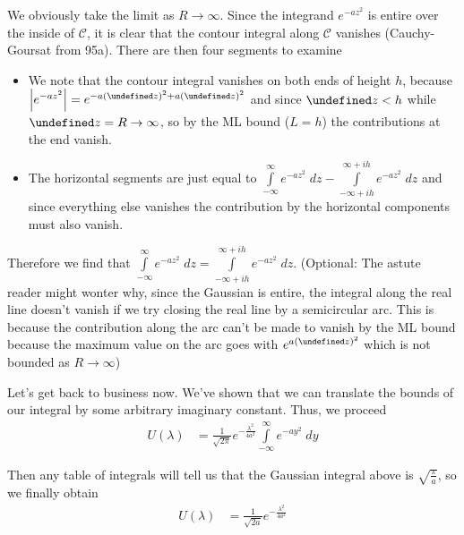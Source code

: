\documentclass[10pt]{article}
\newcommand{\abs}[1]{\left|#1\right|}
\let\Re\undefined
\let\Im\undefined
\DeclareMathOperator{\Re}{Re}
\DeclareMathOperator{\Im}{Im}
\begin{document}
{We obviously take the limit as $R \to \infty$. Since the integrand $e^{-az^2}$ is entire over the inside of $\mathcal{C}$, it is clear that the contour integral along $\mathcal{C}$ vanishes (Cauchy-Goursat from 95a). There are then four segments to examine
\begin{itemize}
    \item We note that the contour integral vanishes on both ends of height $h$, because $\abs{e^{-az^2}} = e^{-a(\Re z)^2 + a(\Im z)^2}$ and since $\Im z < h$ while $\Re z = R \to \infty$, so by the ML bound ($L = h$) the contributions at the end vanish.
    \item The horizontal segments are just equal to $\int\limits_{-\infty}^{\infty}e^{-az^2}\;dz - \int\limits_{-\infty + ih}^{\infty+ ih}e^{-az^2}\;dz$ and since everything else vanishes the contribution by the horizontal components must also vanish.
\end{itemize}

Therefore we find that $\int\limits_{-\infty}^{\infty}e^{-az^2}\;dz = \int\limits_{-\infty + ih}^{\infty+ ih}e^{-az^2}\;dz$. (Optional: The astute reader might wonter why, since the Gaussian is entire, the integral along the real line doesn't vanish if we try closing the real line by a semicircular arc. This is because the contribution along the arc can't be made to vanish by the ML bound because the maximum value on the arc goes with $e^{a(\Im z)^2}$ which is not bounded as $R \to \infty$)

Let's get back to business now. We've shown that we can translate the bounds of our integral by some arbitrary imaginary constant. Thus, we proceed
\begin{align}
    U(\lambda) &= \frac{1}{\sqrt{2\pi}}e^{-\frac{\lambda^2}{4a^2}}\int\limits_{-\infty}^{\infty}e^{-ay^2}\;dy
\end{align}

Then any table of integrals will tell us that the Gaussian integral above is $\sqrt{\frac{\pi}{a}}$, so we finally obtain
\begin{align}
    U(\lambda) &= \frac{1}{\sqrt{2a}}e^{-\frac{\lambda^2}{4a^2}}
\end{align}
}
\end{document}
